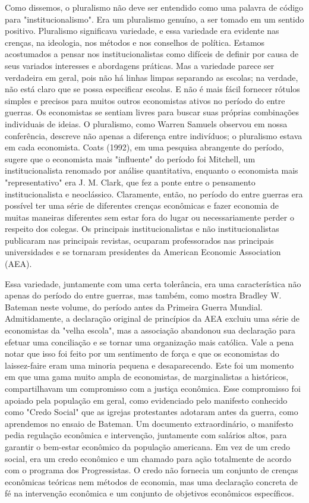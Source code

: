\documentclass[a4paper,12pt]{article}[abntex2]
\begin{document}
Como dissemos, o pluralismo não deve ser entendido como uma palavra de código para "institucionalismo". Era um pluralismo genuíno, a ser tomado em um sentido positivo. Pluralismo significava variedade, e essa variedade era evidente nas crenças, na ideologia, nos métodos e nos conselhos de política. Estamos acostumados a pensar nos institucionalistas como difíceis de definir por causa de seus variados interesses e abordagens práticas. Mas a variedade parece ser verdadeira em geral, pois não há linhas limpas separando as escolas; na verdade, não está claro que se possa especificar escolas. E não é mais fácil fornecer rótulos simples e precisos para muitos outros economistas ativos no período do entre guerras. Os economistas se sentiam livres para buscar suas próprias combinações individuais de ideias. O pluralismo, como Warren Samuels observou em nossa conferência, descreve não apenas a diferença entre indivíduos; o pluralismo estava em cada economista. Coats (1992), em uma pesquisa abrangente do período, sugere que o economista mais "influente" do período foi Mitchell, um institucionalista renomado por análise quantitativa, enquanto o economista mais "representativo" era J. M. Clark, que fez a ponte entre o pensamento institucionalista e neoclássico. Claramente, então, no período do entre guerras era possível ter uma série de diferentes crenças econômicas e fazer economia de muitas maneiras diferentes sem estar fora do lugar ou necessariamente perder o respeito dos colegas. Os principais institucionalistas e não institucionalistas publicaram nas principais revistas, ocuparam professorados nas principais universidades e se tornaram presidentes da American Economic Association (AEA).

Essa variedade, juntamente com uma certa tolerância, era uma característica não apenas do período do entre guerras, mas também, como mostra Bradley W. Bateman neste volume, do período antes da Primeira Guerra Mundial. Admitidamente, a declaração original de princípios da AEA excluiu uma série de economistas da "velha escola", mas a associação abandonou sua declaração para efetuar uma conciliação e se tornar uma organização mais católica. Vale a pena notar que isso foi feito por um sentimento de força e que os economistas do laissez-faire eram uma minoria pequena e desaparecendo. Este foi um momento em que uma gama muito ampla de economistas, de marginalistas a históricos, compartilhavam um compromisso com a justiça econômica. Esse compromisso foi apoiado pela população em geral, como evidenciado pelo manifesto conhecido como "Credo Social" que as igrejas protestantes adotaram antes da guerra, como aprendemos no ensaio de Bateman. Um documento extraordinário, o manifesto pedia regulação econômica e intervenção, juntamente com salários altos, para garantir o bem-estar econômico da população americana. Em vez de um credo social, era um credo econômico e um chamado para ação totalmente de acordo com o programa dos Progressistas. O credo não fornecia um conjunto de crenças econômicas teóricas nem métodos de economia, mas uma declaração concreta de fé na intervenção econômica e um conjunto de objetivos econômicos específicos.
\end{document}
